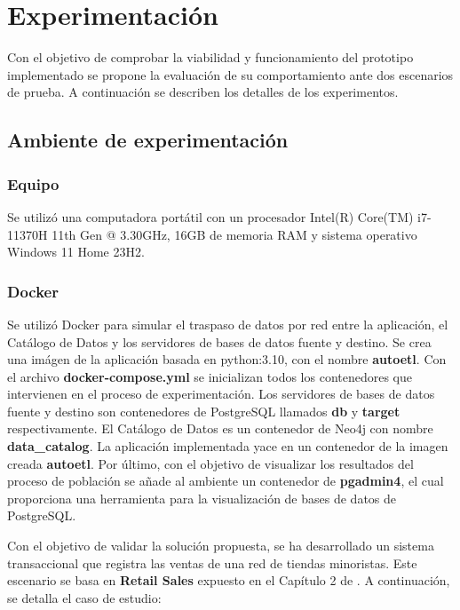 \section{Experimentaci\'on} \label{section:Experimentation}

Con el objetivo de comprobar la viabilidad y funcionamiento del prototipo implementado se propone la evaluaci\'on 
de su comportamiento ante dos escenarios de prueba. A continuaci\'on se describen los detalles de los experimentos.

\subsection{Ambiente de experimentaci\'on}

\subsubsection{Equipo}

Se utilizó una computadora portátil con un procesador Intel(R) Core(TM) i7-11370H 11th Gen @ 3.30GHz, 16GB de 
memoria RAM y sistema operativo Windows 11 Home 23H2.

\subsubsection{Docker}

Se utilizó Docker para simular el traspaso de datos por red entre la aplicaci\'on, el Cat\'alogo de Datos y 
los servidores de bases de datos fuente y destino. Se crea una im\'agen de la aplicaci\'on basada en python:3.10, con el 
nombre \textbf{autoetl}. 
Con el archivo \textbf{docker-compose.yml} se inicializan todos los contenedores que intervienen en el proceso 
de experimentaci\'on. Los servidores de bases de datos fuente y destino son contenedores de PostgreSQL llamados 
\textbf{db} y \textbf{target} respectivamente. El Cat\'alogo de Datos es un contenedor de Neo4j con nombre 
\textbf{data\_catalog}. La aplicaci\'on implementada yace en un contenedor de la imagen creada \textbf{autoetl}. 
Por \'ultimo, con el objetivo de visualizar los resultados del proceso de poblaci\'on se añade al ambiente un 
contenedor de \textbf{pgadmin4}, el cual proporciona una herramienta para la visualizaci\'on de bases de datos 
de PostgreSQL.




Con el objetivo de validar la solución propuesta, se ha desarrollado un sistema transaccional que registra las 
ventas de una red de tiendas minoristas. Este escenario se basa en \textbf{Retail Sales} expuesto en el Cap\'itulo 2
de \cite{kimball2011data}. A continuación, se detalla el caso de estudio:

